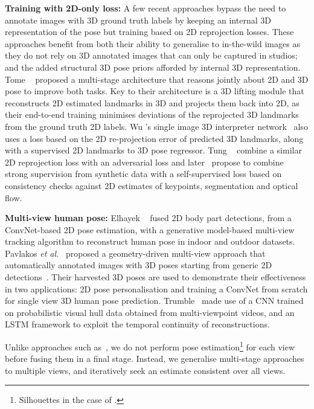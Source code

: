 \documentclass[10pt,twocolumn,letterpaper]{article}
\begin{document}
{\bf Training with 2D-only loss:} A few recent approaches bypass the need to
annotate images with 3D ground truth labels by keeping an internal 3D
representation of the pose but training based on 2D reprojection losses. These
approaches benefit from both their ability to generalise to in-the-wild images as they
do not rely on 3D annotated images that can only be captured in studios; and the
added structural 3D pose priors afforded by internal 3D representation. Tome
\etal~\cite{tome2017lifting} proposed a multi-stage architecture that reasons
jointly about 2D and 3D pose to improve both tasks. Key to their architecture is
a 3D lifting module that reconstructs 2D estimated landmarks in 3D and projects
them back into 2D, as their end-to-end training minimises deviations of the
reprojected 3D landmarks from the ground truth 2D labels. Wu \etal's single
image 3D interpreter network~\cite{wu2016single} also uses a loss based on the
2D re-projection error of predicted 3D landmarks, along with a supervised 2D
landmarks to 3D pose regressor. Tung \etal~\cite{tung2017adversarial} combine a
similar 2D reprojection loss with an adversarial loss and
later~\cite{tung2017self} propose to combine strong supervision from synthetic
data with a self-supervised loss based on consistency checks against 2D
estimates of keypoints, segmentation and optical flow.

{\bf Multi-view human pose:} Elhayek \etal~\cite{elhayek2015efficient}
fused 2D body part detections, from a ConvNet-based 2D pose estimation,
with a generative model-based multi-view tracking algorithm to reconstruct human
pose in indoor and outdoor datasets. Pavlakos \emph{et
 al.}~\cite{pavlakos2017harvesting} proposed a geometry-driven multi-view
approach that automatically annotated images with 3D poses starting from generic
2D detections~\cite{newell2016stacked}. Their harvested 3D poses are used to
demonstrate their effectiveness in two applications: 2D pose personalisation and
training a ConvNet from scratch for single view 3D human pose prediction.
Trumble~\cite{trumble2017total} made use of a CNN trained on probabilistic
visual hull data obtained from multi-viewpoint videos, and an LSTM framework to
exploit the temporal continuity of reconstructions.


Unlike  approaches such
as~\cite{elhayek2015efficient,pavlakos2017harvesting,trumble2017total}, we do
not perform pose estimation\footnote{Silhouettes in the
  case of \cite{trumble2017total}.} for each view before fusing them in a final
stage. Instead, we generalise  multi-stage approaches\cite{wei2016convolutional,tome2017lifting} to multiple
views, and iteratively seek an estimate consistent over all views. 
\end{document}
